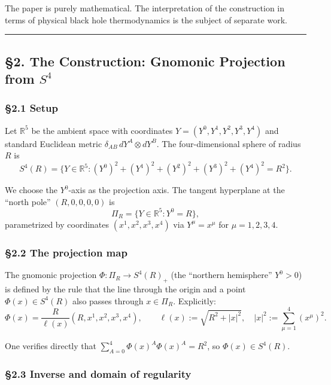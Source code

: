 \documentclass[a4paper,11pt]{article}
\theoremstyle{definition}
\begin{document}
The paper is purely mathematical. The interpretation of the construction
in terms of physical black hole thermodynamics is the subject of
separate work.

\begin{center}\rule{0.5\linewidth}{0.5pt}\end{center}

\subsection{\texorpdfstring{§2. The Construction: Gnomonic Projection
from
\(S^4\)}{§2. The Construction: Gnomonic Projection from S\^{}4}}\label{the-construction-gnomonic-projection-from-s4}

\subsubsection{§2.1 Setup}\label{setup}

Let \(\mathbb{R}^5\) be the ambient space with coordinates
\(Y = (Y^0, Y^1, Y^2, Y^3, Y^4)\) and standard Euclidean metric
\(\delta_{AB}\, dY^A \otimes dY^B\). The four-dimensional sphere of
radius \(R\) is
\[S^4(R) = \{Y \in \mathbb{R}^5 : (Y^0)^2 + (Y^1)^2 + (Y^2)^2 + (Y^3)^2 + (Y^4)^2 = R^2\}.\]

We choose the \(Y^0\)-axis as the projection axis. The tangent
hyperplane at the ``north pole'' \((R, 0, 0, 0, 0)\) is
\[\Pi_R = \{Y \in \mathbb{R}^5 : Y^0 = R\},\] parametrized by
coordinates \((x^1, x^2, x^3, x^4)\) via \(Y^\mu = x^\mu\) for
\(\mu = 1, 2, 3, 4\).

\subsubsection{§2.2 The projection map}\label{the-projection-map}

The gnomonic projection \(\Phi : \Pi_R \to S^4(R)_+\) (the ``northern
hemisphere'' \(Y^0 > 0\)) is defined by the rule that the line through
the origin and a point \(\Phi(x) \in S^4(R)\) also passes through
\(x \in \Pi_R\). Explicitly:
\[\Phi(x) = \frac{R}{\ell(x)} (R, x^1, x^2, x^3, x^4), \qquad \ell(x) := \sqrt{R^2 + |x|^2}, \quad |x|^2 := \sum_{\mu=1}^{4} (x^\mu)^2.\]

One verifies directly that \(\sum_{A=0}^{4} \Phi(x)^A \Phi(x)^A = R^2\),
so \(\Phi(x) \in S^4(R)\).

\subsubsection{§2.3 Inverse and domain of
regularity}\label{inverse-and-domain-of-regularity}
\end{document}

